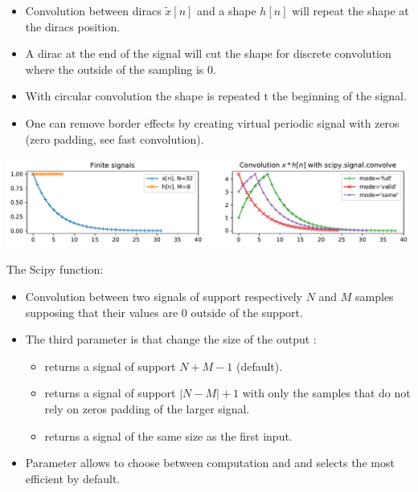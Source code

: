 \begin{itemize}
  \item Convolution between diracs $\tilde x[n]$ and a shape $h[n]$ will repeat the shape at the diracs position.
  \item A dirac at the end of the signal will cut the shape for discrete convolution where the outside of the sampling is $0$.
  \item With circular convolution the shape is repeated t the beginning of the signal.
  \item One can remove border effects by creating virtual periodic signal with zeros (zero padding, see fast convolution).
\end{itemize}



\begin{center}
  \includegraphics[width=1\linewidth]{imgs/sig_conv/conv_scipy_signal.pdf}
\end{center}\vspace{-2mm}

\begin{block}{The Scipy  function:}\vspace{-2mm}
  \begin{itemize}
      \item Convolution between two signals of support respectively $N$ and $M$ samples supposing that their values are $0$ outside of the support.
      \item The third parameter is  that change the size of the output : \vspace{-1mm}
      \begin{itemize}
          \item {} returns a signal of support $N+M-1$ (default).
          \item {} returns a signal of support $|N-M|+1$ with only  the samples that do not rely on zeros padding of the larger signal.
          \item {} returns a signal of the same size as the first input.
      \end{itemize}
      \item Parameter  allows to choose between  computation and  and selects the most efficient by default.
  \end{itemize}
  

  
\end{block}\vspace{-2mm}


